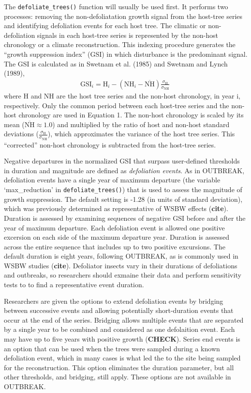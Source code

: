 \documentclass[review]{elsarticle} %
\begin{document}
The \texttt{defoliate\_trees()} function will usually be used first. It
performs two processes: removing the non-defoliatation growth signal
from the host-tree series and identifying defoliation events for each
host tree. The climatic or non-defoliation signals in each host-tree
series is represented by the non-host chronology or a climate
reconstruction. This indexing procedure generates the ``growth
suppression index'' (GSI) in which disturbance is the predominant
signal. The GSI is calculated as in Swetnam et al. (1985) and Swetnam
and Lynch (1989), \begin{align}
\textrm{GSI}_{i} = \textrm{H}_{i} - \left( \textrm{NH}_{i} - \overline{\textrm{NH}} \right) \frac{\sigma_{\textrm{H}}}{\sigma_{\textrm{NH}}} \
\end{align} where H and NH are the host tree series and the non-host
chronology, in year i, respectively. Only the common period between each
host-tree series and the non-host chronology are used in Equation 1. The
non-host chronology is scaled by its mean
(\(\overline{\textrm{NH}} \approx 1.0\)) and multiplied by the ratio of
host and non-host standard deviations
(\(\frac{\sigma_{\textrm{H}}}{\sigma_{\textrm{NH}}}\)), which
approximates the variance of the host tree series. This ``corrected''
non-host chronology is subtracted from the host-tree series.

Negative departures in the normalized GSI that surpass user-defined
thresholds in duration and magnitude are defined as \emph{defoliation
events}. As in OUTBREAK, defoliation events have a single year of
maximum departure (the variable `max\_reduction' in
\texttt{defoliate\_trees()}) that is used to assess the magnitude of
growth suppression. The default setting is -1.28 (in units of standard
deviation), which was previously determined as representative of WSBW
effects (\textbf{cite}). Duration is assessed by examining sequences of
negative GSI before and after the year of maximum departure. Each
defoliation event is allowed one positive excersion on each side of the
maximum departure year. Duration is assessed across the entire sequence
that includes up to two positive excursions. The default duration is
eight years, following OUTBREAK, as is commonly used in WSBW studies
(\textbf{cite}). Defoliator insects vary in their durations of
defoliations and outbreaks, so researchers should exmaine their data and
perform sensitivity tests to to find a representative event duration.

Researchers are given the options to extend defoliation events by
bridging between successive events and allowing potentially
short-duration events that occur at the end of the series. Bridging
allows multiple events that are separated by a single year to be
combined and considered as one defolaition event. Each may have up to
five years with positive growth (\textbf{CHECK}). Series end events is
an option that can be used when the trees were sampled during a known
defoliation event, which in many cases is what led the to the site being
sampled for the reconstruction. This option eliminates the duration
parameter, but all other thresholds, and bridging, still apply. These
options are not available in OUTBREAK.
\end{document}
